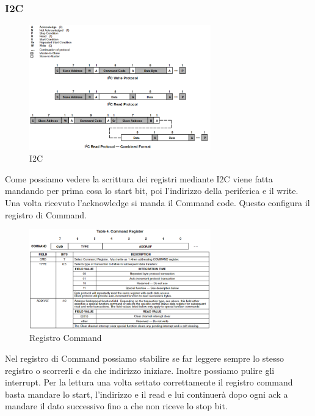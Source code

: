 \documentclass[a4paper,12pt]{report}
\begin{document}
\subsubsection{I2C}
\begin{figure}[h]
    \centering
    \includegraphics[width=0.70\textwidth]{images/Immagini sensore/I2C.png}
    \caption{I2C}
\end{figure}
Come possiamo vedere la scrittura dei registri mediante I2C viene fatta mandando per prima cosa lo start bit, poi l'indirizzo della periferica e il write. Una volta ricevuto l'acknowledge si manda il Command code. Questo configura il registro di Command.
\begin{figure}[h]
    \centering
    \includegraphics[width=0.7\textwidth]{images/Immagini sensore/registro di command.png}
    \caption{Registro Command}
    \label{fig:comm}
\end{figure}
Nel registro di Command possiamo stabilire se far leggere sempre lo stesso registro o scorrerli e da che indirizzo iniziare. Inoltre possiamo pulire gli interrupt.
Per la lettura una volta settato correttamente il registro command basta mandare lo start, l'indirizzo e il read e lui continuerà dopo ogni ack a mandare il dato successivo fino a che non riceve lo stop bit.
\end{document}
